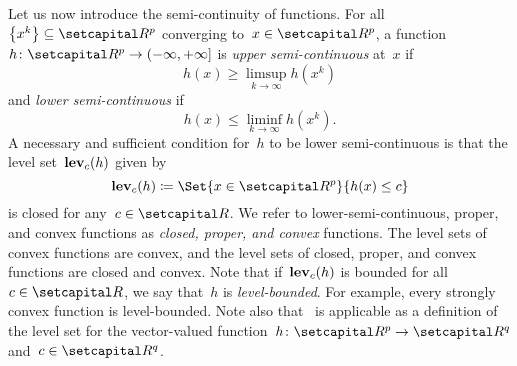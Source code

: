 \documentclass[../main]{subfiles}
\begin{document}
Let us now introduce the semi-continuity of functions.
For all~$\set*{x^k} \subseteq \setR^p$ converging to~$x \in \setR^p$, a function~$h \colon \setR^p \to (-\infty, +\infty]$ is \emph{upper semi-continuous} at~$x$ if
\begin{equation}
    h(x) \ge \limsup_{k \to \infty} h\left(x^k\right)
\end{equation}
and \emph{lower semi-continuous} if
\begin{equation}
    h(x) \le \liminf_{k \to \infty} h\left(x^k\right)
    .\end{equation}
A necessary and sufficient condition for~$h$ to be lower semi-continuous is that the level set~$\operatorname{\mathbf{lev}}_c(h)$ given by
\begin{equation} \label{eq:level}
    \level_c(h) \coloneqq \Set{x \in \setR^p}{h(x) \le c}
\end{equation}
is closed for any~$c \in \setR$.
We refer to lower-semi-continuous, proper, and convex functions as \emph{closed, proper, and convex} functions.
The level sets of convex functions are convex, and the level sets of closed, proper, and convex functions are closed and convex.
Note that if~$\operatorname{\mathbf{lev}}_c(h)$ is bounded for all~$c \in \setR$, we say that~$h$ is \emph{level-bounded}.
For example, every strongly convex function is level-bounded.
Note also that~ is applicable as a definition of the level set for the vector-valued function~$h \colon \setR^p \to \setR^q$ and~$c \in \setR^q$.
\end{document}
